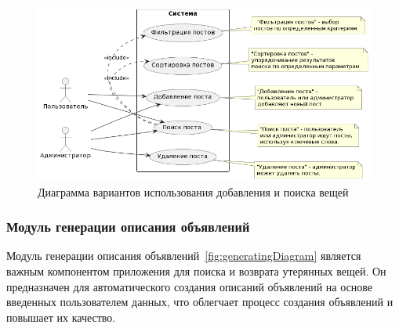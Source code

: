 \begin{figure}[htb]
	\centering
	\includegraphics[width=.9\textwidth]{images/seach-diagram-2.png}
	\parskip=6pt
	\caption{Диаграмма вариантов использования добавления и поиска вещей}
	\label{fig:searchDiagram2}
\end{figure}

\subsubsection{Модуль генерации описания объявлений}

Модуль генерации описания объявлений~\ref{fig:generatingDiagram} является важным компонентом приложения для поиска и возврата утерянных вещей. Он предназначен для автоматического создания описаний объявлений на основе введенных пользователем данных, что облегчает процесс создания объявлений и повышает их качество.

